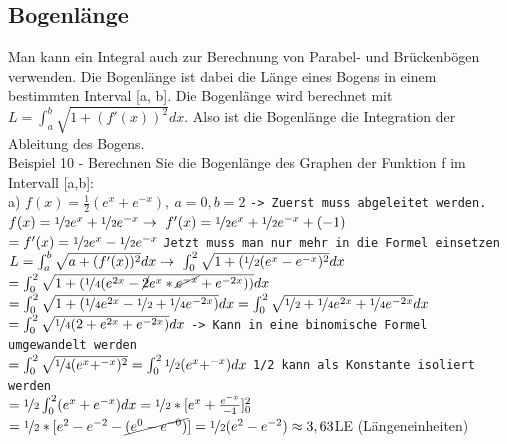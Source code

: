 \documentclass{article}
\begin{document}
	\subsection{Bogenlänge}
	Man kann ein Integral auch zur Berechnung von Parabel- und Brückenbögen verwenden. Die Bogenlänge ist dabei die Länge eines Bogens in einem bestimmten Interval [a, b]. Die Bogenlänge wird berechnet mit $L=\int_{a}^{b}\sqrt{1+(f'(x))^2}dx$. Also ist die Bogenlänge die Integration der Ableitung des Bogens. \\
	Beispiel 10 - Berechnen Sie die Bogenlänge des Graphen der Funktion f im Intervall [a,b]: \\
	a) $f(x)=\frac{1}{2}(e^x+e^{-x}),\ a=0, b=2$ \verb|-> Zuerst muss abgeleitet werden.| \\
	$f(x)=\nicefrac{1}{2}e^x+\nicefrac{1}{2}e^{-x}\to\ f'(x)=\nicefrac{1}{2}e^x+\nicefrac{1}{2}e^{-x}+(-1)$ \\
	$=f'(x)=\nicefrac{1}{2}e^x-\nicefrac{1}{2}e^{-x}$ \verb|Jetzt muss man nur mehr in die Formel einsetzen| \\
	$L=\int_{a}^{b}\sqrt{a+(f'(x))^2}dx\to\ \int_{0}^{2}\sqrt{1+(\nicefrac{1}{2}(e^x-e^{-x})^2}dx$ \\
	$=\int_{0}^{2}\sqrt{1+(\nicefrac{1}{4}(e^{2x}-\cancel{2}e^x*\cancel{e^{-x}}+e^{-2x}))}dx$ \\
	$=\int_{0}^{2}\sqrt{1+(\nicefrac{1}{4}e^{2x}-\nicefrac{1}{2}+\nicefrac{1}{4}e^{-2x})}dx=\int_{0}^{2}\sqrt{\nicefrac{1}{2}+\nicefrac{1}{4}e^{2x}+\nicefrac{1}{4}e^{-2x}}dx$ \\
	$=\int_{0}^{2}\sqrt{\nicefrac{1}{4}(2+e^{2x}+e^{-2x})}dx$ \verb|-> Kann in eine binomische Formel umgewandelt werden| \\
	$=\int_{0}^{2}\sqrt{\nicefrac{1}{4}(e^x+^{-x})^2}=\int_{0}^{2}\nicefrac{1}{2}(e^x+^{-x})dx$ \verb|1/2 kann als Konstante isoliert werden| \\
	$=\nicefrac{1}{2}\int_{0}^{2}(e^x+e^{-x})dx=\nicefrac{1}{2}*[e^x+\frac{e^{-x}}{-1}]_0^2$ \\
	$=\nicefrac{1}{2}*[e^2-e^{-2}-\cancel{(e^0-e^{-0})}]=\nicefrac{1}{2}(e^2-e^{-2})\approx 3,63$LE (Längeneinheiten)

	
\end{document}
